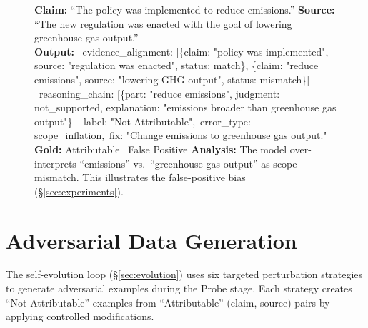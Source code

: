 \documentclass[11pt]{article}
\newcommand{\xmark}{\ding{55}}
\begin{document}
\begin{figure}[!ht]
\begin{minipage}[t]{0.98\textwidth}
\begin{examplebox}[title={Ex.\,3: False positive --- over-sensitive to paraphrase}]
\scriptsize
\textbf{Claim:} ``The policy was implemented to reduce emissions.'' \quad
\textbf{Source:} ``The new regulation was enacted with the goal of lowering greenhouse gas output.''\\[1pt]
\textbf{Output:}
{\ttfamily\ evidence\_alignment: [\{claim: "policy was implemented", source: "regulation was enacted", status: match\}, \{claim: "reduce emissions", source: "lowering GHG output", status: mismatch\}]
\ reasoning\_chain: [\{part: "reduce emissions", judgment: not\_supported, explanation: "emissions broader than greenhouse gas output"\}]
\ label: "Not Attributable",\ error\_type: scope\_inflation,\ fix: "Change emissions to greenhouse gas output."}\\[2pt]
\textbf{Gold:} Attributable \quad \xmark\ False Positive \quad
\textbf{Analysis:} The model over-interprets ``emissions'' vs.\ ``greenhouse gas output'' as scope mismatch. This illustrates the false-positive bias (\S\ref{sec:experiments}).
\end{examplebox}
\end{minipage}
\end{figure}


\section{Adversarial Data Generation}
\label{app:adversarial}

The self-evolution loop (\S\ref{sec:evolution}) uses six targeted perturbation strategies to generate adversarial examples during the Probe stage.
Each strategy creates ``Not Attributable'' examples from ``Attributable'' (claim, source) pairs by applying controlled modifications.
\end{document}
